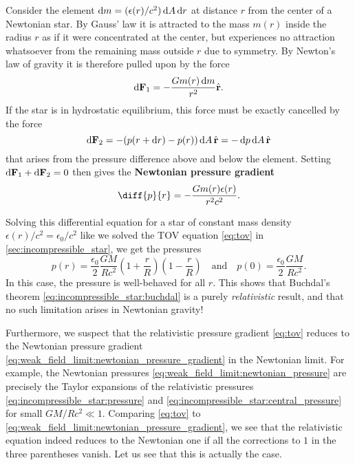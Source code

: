 Consider the element $\mathop{}\!\mathrm{d} m = (\epsilon(r)/c^2) \mathop{}\!\mathrm{d} A \mathop{}\!\mathrm{d} r$ at distance $r$ from the center of a Newtonian star.
By Gauss' law it is attracted to the mass $m(r)$ inside the radius $r$ as if it were concentrated at the center, but experiences no attraction whatsoever from the remaining mass outside $r$ due to symmetry.
By Newton's law of gravity it is therefore pulled upon by the force
\begin{equation}
	\mathop{}\!\mathrm{d} \mathbf{F}_1 = -\frac{G m(r) \mathop{}\!\mathrm{d} m}{r^2} \hat{\textbf{r}} .
	\label{eq:weak_field_limit:force_newton}
\end{equation}
If the star is in hydrostatic equilibrium, this force must be exactly cancelled by the force
\begin{equation}
	\mathop{}\!\mathrm{d} \textbf{F}_2 = -(p(r + \mathop{}\!\mathrm{d} r) - p(r)) \mathop{}\!\mathrm{d} A \, \hat{\textbf{r}} = -\mathop{}\!\mathrm{d} p \mathop{}\!\mathrm{d} A \, \hat{\textbf{r}}
	\label{eq:weak_field_limit:force_pressure}
\end{equation}
that arises from the pressure difference above and below the element.
Setting $\mathop{}\!\mathrm{d} \textbf{F}_1 + \mathop{}\!\mathrm{d} \textbf{F}_2 = 0$ then gives the \textbf{Newtonian pressure gradient}
\begin{equation}
	\diff{p}{r} = -\frac{G m(r) \epsilon(r)}{r^2c^2} .
	\label{eq:weak_field_limit:newtonian_pressure_gradient}
\end{equation}

Solving this differential equation for a star of constant mass density $\epsilon(r)/c^2 = \epsilon_0/c^2$ like we solved the TOV equation \eqref{eq:tov} in \cref{sec:incompressible_star}, we get the pressures
\begin{equation}
	p(r) = \frac{\epsilon_0}{2} \frac{G M}{R c^2} \left( 1 + \frac{r}{R} \right) \left( 1 - \frac{r}{R} \right)
	\quad \text{and} \quad
	p(0) = \frac{\epsilon_0}{2} \frac{GM}{R c^2} .
	\label{eq:weak_field_limit:newtonian_pressure}
\end{equation}
In this case, the pressure is well-behaved for all $r$.
This shows that Buchdal's theorem \eqref{eq:incompressible_star:buchdal} is a purely \emph{relativistic} result, and that no such limitation arises in Newtonian gravity!


Furthermore, we suspect that the relativistic pressure gradient \eqref{eq:tov} reduces to the Newtonian pressure gradient \eqref{eq:weak_field_limit:newtonian_pressure_gradient} in the Newtonian limit.
For example, the Newtonian pressures \eqref{eq:weak_field_limit:newtonian_pressure} are precisely the Taylor expansions of the relativistic pressures \eqref{eq:incompressible_star:pressure} and \eqref{eq:incompressible_star:central_pressure} for small $GM/Rc^2 \ll 1$.
Comparing \cref{eq:tov} to \cref{eq:weak_field_limit:newtonian_pressure_gradient}, we see that the relativistic equation indeed reduces to the Newtonian one if all the corrections to $1$ in the three parentheses vanish.
Let us see that this is actually the case.

